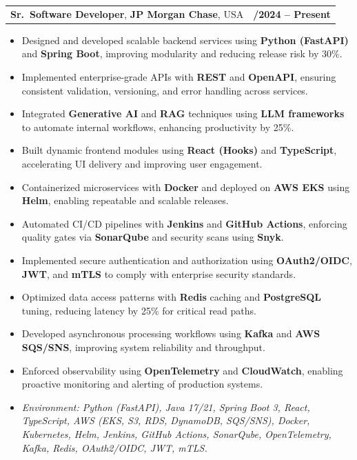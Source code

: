 \documentclass[letterpaper,11pt]{article}
\makeatletter
\newcommand{\resumeItem}[1]{
  \item\footnotesize{
    {#1 \vspace{-2pt}}
  }
}
\newcommand{\resumeSubheading}[4]{
  \vspace{-2pt}\item
    \begin{tabular*}{1.0\textwidth}[t]{l@{\extracolsep{\fill}}r}
      \textbf{\fontsize{10pt}{14pt}\selectfont #3}, \textbf{\fontsize{10pt}{14pt}\selectfont #1}, \fontsize{10pt}{14pt}\selectfont #4 & \textbf{\fontsize{10pt}{14pt}\selectfont #2} \\
    \end{tabular*}\vspace{-7pt}
}
\newcommand{\resumeItemListStart}{\begin{itemize}[leftmargin=*]}
\newcommand{\resumeItemListEnd}{\end{itemize}\vspace{-5pt}}
\makeatother
\begin{document}
\resumeSubheading
{JP Morgan Chase}{09/2024 -- Present}
{Sr.\ Software Developer}{USA}
\resumeItemListStart
  \resumeItem{Designed and developed scalable backend services using \textbf{Python (FastAPI)} and \textbf{Spring Boot}, improving modularity and reducing release risk by 30\%.}
  \resumeItem{Implemented enterprise-grade APIs with \textbf{REST} and \textbf{OpenAPI}, ensuring consistent validation, versioning, and error handling across services.}
  \resumeItem{Integrated \textbf{Generative AI} and \textbf{RAG} techniques using \textbf{LLM frameworks} to automate internal workflows, enhancing productivity by 25\%.}
  \resumeItem{Built dynamic frontend modules using \textbf{React (Hooks)} and \textbf{TypeScript}, accelerating UI delivery and improving user engagement.}
  \resumeItem{Containerized microservices with \textbf{Docker} and deployed on \textbf{AWS EKS} using \textbf{Helm}, enabling repeatable and scalable releases.}
  \resumeItem{Automated CI/CD pipelines with \textbf{Jenkins} and \textbf{GitHub Actions}, enforcing quality gates via \textbf{SonarQube} and security scans using \textbf{Snyk}.}
  \resumeItem{Implemented secure authentication and authorization using \textbf{OAuth2/OIDC}, \textbf{JWT}, and \textbf{mTLS} to comply with enterprise security standards.}
  \resumeItem{Optimized data access patterns with \textbf{Redis} caching and \textbf{PostgreSQL} tuning, reducing latency by 25\% for critical read paths.}
  \resumeItem{Developed asynchronous processing workflows using \textbf{Kafka} and \textbf{AWS SQS/SNS}, improving system reliability and throughput.}
  \resumeItem{Enforced observability using \textbf{OpenTelemetry} and \textbf{CloudWatch}, enabling proactive monitoring and alerting of production systems.}
  \resumeItem{\textit{Environment: Python (FastAPI), Java 17/21, Spring Boot 3, React, TypeScript, AWS (EKS, S3, RDS, DynamoDB, SQS/SNS), Docker, Kubernetes, Helm, Jenkins, GitHub Actions, SonarQube, OpenTelemetry, Kafka, Redis, OAuth2/OIDC, JWT, mTLS.}}
\resumeItemListEnd
\end{document}
